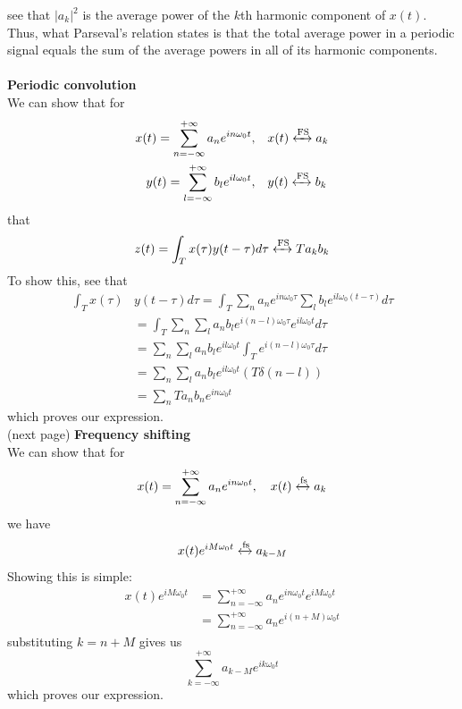 \documentclass{report}
\begin{document}
see that $|a_k|^2$ is the average power of the $k$th harmonic component of $x(t)$. Thus, what Parseval's relation states is that the total average power in a periodic signal equals the sum
of the average powers in all of its harmonic components.\\
\vspace{1mm}\\
\textbf{Periodic convolution}\\
We can show that for
\begin{align*}
x(t)=\sum^{+\infty}_{n=-\infty}a_ne^{in\omega_0t},&\quad x(t)\xleftrightarrow[]{\text{FS}}a_k\\
y(t)=\sum^{+\infty}_{l=-\infty}b_le^{il\omega_0t},&\quad y(t)\xleftrightarrow[]{\text{FS}}b_k
\end{align*}
that
\begin{equation*}
z(t)=\int_Tx(\tau)y(t-\tau)d\tau\xleftrightarrow[]{\text{FS}}Ta_kb_k
\end{equation*}
To show this, see that
\begin{align*}
\int_Tx(\tau)&y(t-\tau)d\tau=\int_T\sum_{n}a_ne^{in\omega_0\tau}
\sum_{l}b_le^{il\omega_0(t-\tau)}d\tau\\
&=\int_T\sum_n\sum_la_nb_le^{i(n-l)\omega_0\tau}e^{il\omega_0t}d\tau\\
&=\sum_n\sum_la_nb_le^{il\omega_0t}\int_Te^{i(n-l)\omega_0\tau}d\tau\\
&=\sum_n\sum_la_nb_le^{il\omega_0t}(T\delta(n-l))\\
&=\sum_nTa_nb_ne^{in\omega_0t}
\end{align*}
which proves our expression.\\
(next page)\newpage
\noindent\textbf{Frequency shifting}\\
We can show that for
\begin{equation*}
x(t)=\sum^{+\infty}_{n=-\infty}a_ne^{in\omega_0t},\quad x(t)\xleftrightarrow[]{\text{fs}}a_k
\end{equation*}
we have
\begin{equation*}
x(t)e^{iM\omega_0t}\xleftrightarrow[]{\text{fs}}a_{k-M}
\end{equation*}
Showing this is simple:
\begin{align*}
x(t)e^{iM\omega_0t}&=\sum^{+\infty}_{n=-\infty}a_ne^{in\omega_0t}e^{iM\omega_0t}\\
&=\sum^{+\infty}_{n=-\infty}a_ne^{i(n+M)\omega_0t}
\end{align*}
substituting $k=n+M$ gives us
\begin{equation*}
\sum^{+\infty}_{k=-\infty}a_{k-M}e^{ik\omega_0t}
\end{equation*}
which proves our expression.
\newpage
\end{document}
